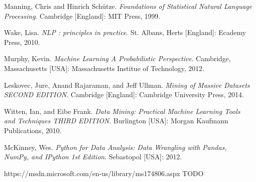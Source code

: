 \documentclass[12pt]{report}
\begin{document}
\begin{thebibliography}{9}

 Manning, Chris and Hinrich Sch{\"u}tze. \textit{Foundations of Statistical Natural Language Processing}. Cambridge [England]: MIT Press, 1999.

 Wake, Lisa. \textit{NLP : principles in practice}. St. Albans, Herts [England]: Ecademy Press, 2010.

 Murphy, Kevin. \textit{Machine Learning A Probabilistic Perspective}. Cambridge, Massachusetts [USA]: Massachusetts Institue of Technology, 2012.

 Leskovec, Jure, Anand Rajaraman, and Jeff Ullman. \textit{Mining of Massive Datasets SECOND EDITION}. Cambridge [England]: Cambridge University Press, 2014.

 Witten, Ian, and Eibe Frank. \textit{Data Mining: Practical Machine Learning Tools and Techniques THIRD EDITION}. Burlington [USA]: Morgan Kaufmann Publications, 2010.

 McKinney, Wes. \textit{Python for Data Analysis: Data Wrangling with Pandas, NumPy, and IPython 1st Edition}. Sebastopol [USA]: 2012.

 https://msdn.microsoft.com/en-us/library/ms174806.aspx TODO

\end{thebibliography}
\end{document}
